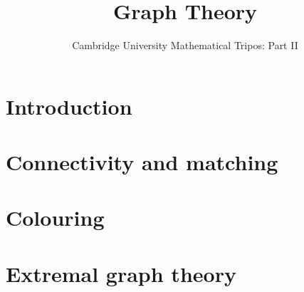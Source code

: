 \documentclass{article}
\title{Graph Theory}
\author{Cambridge University Mathematical Tripos: Part II}
\begin{document}
\maketitle

\tableofcontentsnewpage{}

\section{Introduction}

\section{Connectivity and matching}

\section{Colouring}

\section{Extremal graph theory}

\end{document}
